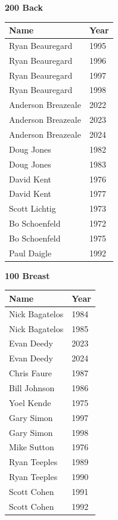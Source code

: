 \vspace{1.2em}
\noindent\begin{minipage}[t]{0.48\textwidth}
\centering
\textbf{\textcolor{teamprimary}{200 Back}}\par
\vspace{0.5em}
\centering
\small
\renewcommand{\arraystretch}{1.0}
\setlength{\tabcolsep}{4pt}
\begin{tabular}{@{}p{3.0cm}p{1.0cm}@{}}
\toprule
\textbf{Name} & \textbf{Year} \\
\midrule
Ryan Beauregard & 1995 \\
Ryan Beauregard & 1996 \\
Ryan Beauregard & 1997 \\
Ryan Beauregard & 1998 \\
Anderson Breazeale & 2022 \\
Anderson Breazeale & 2023 \\
Anderson Breazeale & 2024 \\
Doug Jones & 1982 \\
Doug Jones & 1983 \\
David Kent & 1976 \\
David Kent & 1977 \\
Scott Lichtig & 1973 \\
Bo Schoenfeld & 1972 \\
Bo Schoenfeld & 1975 \\
Paul Daigle & 1992 \\
\bottomrule
\end{tabular}
\end{minipage}
\hfill
\begin{minipage}[t]{0.48\textwidth}
\centering
\textbf{\textcolor{teamprimary}{100 Breast}}\par
\vspace{0.5em}
\centering
\small
\renewcommand{\arraystretch}{1.0}
\setlength{\tabcolsep}{4pt}
\begin{tabular}{@{}p{3.0cm}p{1.0cm}@{}}
\toprule
\textbf{Name} & \textbf{Year} \\
\midrule
Nick Bagatelos & 1984 \\
Nick Bagatelos & 1985 \\
Evan Deedy & 2023 \\
Evan Deedy & 2024 \\
Chris Faure & 1987 \\
Bill Johnson & 1986 \\
Yoel Kende & 1975 \\
Gary Simon & 1997 \\
Gary Simon & 1998 \\
Mike Sutton & 1976 \\
Ryan Teeples & 1989 \\
Ryan Teeples & 1990 \\
Scott Cohen & 1991 \\
Scott Cohen & 1992 \\
\bottomrule
\end{tabular}
\end{minipage}
